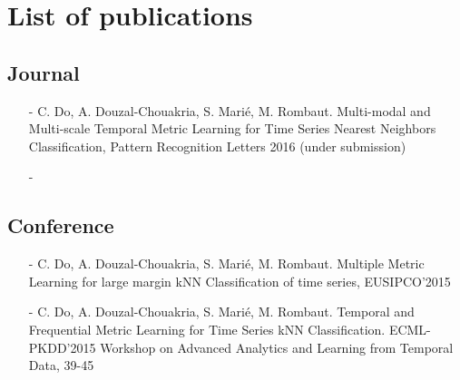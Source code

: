 \chapter*{List of publications}
\label{sec:article}

\section*{Journal}
\begin{itemize}
	\item[-] C. Do, A. Douzal-Chouakria, S. Marié, M. Rombaut. Multi-modal and Multi-scale Temporal Metric Learning for Time Series Nearest Neighbors Classification, Pattern Recognition Letters 2016 (under submission) 
	\item[-] 
\end{itemize}
	
\section*{Conference}
\begin{itemize}
	\item[-] C. Do, A. Douzal-Chouakria, S. Marié, M. Rombaut. Multiple Metric Learning for large margin kNN Classification of time series, EUSIPCO'2015 
	\item[-] C. Do, A. Douzal-Chouakria, S. Marié, M. Rombaut. Temporal and Frequential Metric Learning for Time Series kNN Classification. ECML-PKDD'2015 Workshop on Advanced Analytics and Learning from Temporal Data, 39-45
\end{itemize}
